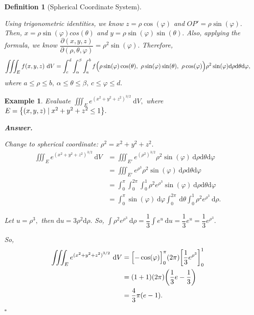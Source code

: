 \documentclass[12pt,a4paper]{article}
\newtheorem{df}{Definition}[subsection]
\newtheorem{eg}{Example}[subsection]
\newenvironment*{ans}{\par\indent\textbf{\textit{Answer. }}\par}{\par\hfill{$\square$}\par}
\def\dsst{\displaystyle}
\def\d{{\mathrm{d}}}
\def\dV{\d V}
\def\del{\partial}
\def\iiintE{\dsst\iiint_E}
\def\phi{\varphi}
\begin{document}
\begin{df}[Spherical Coordinate System]
\begin{center}
	\end{center}
	Using trigonometric identities, we know $z=\rho\cos(\phi)$ and $OP'=\rho\sin(\phi).$ Then, $x=\rho\sin(\phi)cos(\theta)$ and $y=\rho\sin(\phi)\sin(\theta).$ Also, applying the formula, we know $\dfrac{\del(x,y,z)}{\del(\rho,\theta,\phi)}=\rho^2\sin(\phi).$ Therefore, \[\iiintE f(x,y,z)\ \dV=\int_c^d\int_\alpha^\beta\int_a^b f\qty\Big(\rho\sin(\phi)\cos(\theta),\ \rho\sin(\phi)\sin(\theta),\ \rho\cos(\phi))\rho^2\sin(\phi)\d\rho\d\theta\d\phi,\] where $a\leq\rho\leq b,\ \alpha\leq\theta\leq\beta,\ c\leq\phi\leq d.$
\end{df}
\begin{eg}
Evaluate $\iiintE e^{{(x^2+y^2+z^2)}^{3/2}}\ \dV,$ where $E=\qty{(x,y,z)\mid x^2+y^2+z^2\leq1}.$	
\begin{ans}
	Change to spherical coordinate: $\rho^2=x^2+y^2+z^2.$ \[\begin{aligned}\iiintE e^{{(x^2+y^2+z^2)}^{3/2}}\ \dV&=\iiint_{E'}e^{(\rho^2)^{3/2}}\rho^2\sin(\phi)\ \d\rho\d\theta\d\phi\\&=\iiint_{E'}e^{\rho^3}\rho^2\sin(\phi)\ \d\rho\d\theta\d\phi\\&=\int_0^\pi\int_0^{2\pi}\int_0^1\rho^2e^{\rho^3}\sin(\phi)\ \d\rho\d\theta\d\phi\\&=\int_0^\pi\sin(\phi)\ \d\phi\int_0^{2\pi}\ \d\theta\int_0^1\rho^2e^{\rho^3}\ \d\rho.\end{aligned}\]\par Let $u=\rho^3,$ then $\d u=3\rho^2\d\rho.$ So, $\dsst\int\rho^2e^{\rho^3}\ \d\rho=\dfrac{1}{3}\int e^u\ \d u=\dfrac{1}{3}e^u=\dfrac{1}{3}e^{\rho^3}.$\par So, \[\begin{aligned}\iiintE e^{{(x^2+y^2+z^2)}^{3/2}}\ \dV&=\qty\Big[-\cos(\phi)]_0^\pi(2\pi)\qty[\dfrac{1}{3}e^{\rho^3}]_0^1\\&=(1+1)(2\pi)\qty(\dfrac{1}{3}e-\dfrac{1}{3})\\&=\dfrac{4}{3}\pi(e-1).\end{aligned}\]
\end{ans}
\end{eg}
\end{document}
